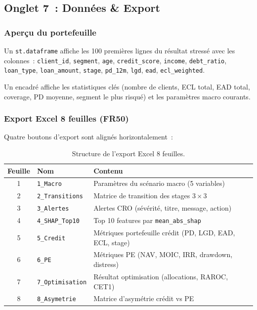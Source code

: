 \documentclass[12pt,a4paper]{article}
\begin{document}
\subsection{Onglet 7~: Donn\'ees \& Export}
\label{sec:tab7}

\subsubsection{Aper\c{c}u du portefeuille}

Un \texttt{st.dataframe} affiche les 100 premi\`eres lignes du r\'esultat stress\'e avec les colonnes~: \texttt{client\_id}, \texttt{segment}, \texttt{age}, \texttt{credit\_score}, \texttt{income}, \texttt{debt\_ratio}, \texttt{loan\_type}, \texttt{loan\_amount}, \texttt{stage}, \texttt{pd\_12m}, \texttt{lgd}, \texttt{ead}, \texttt{ecl\_weighted}.

Un encadr\'e affiche les statistiques cl\'es (nombre de clients, ECL total, EAD total, coverage, PD moyenne, segment le plus risqu\'e) et les param\`etres macro courants.

\subsubsection{Export Excel 8 feuilles (FR50)}

Quatre boutons d'export sont align\'es horizontalement~:

\begin{table}[ht]
\centering
\caption{Structure de l'export Excel 8 feuilles.}
\label{tab:excel}
\small
\begin{tabular}{@{}cll@{}}
\toprule
\textbf{Feuille} & \textbf{Nom} & \textbf{Contenu} \\
\midrule
1 & \texttt{1\_Macro} & Param\`etres du sc\'enario macro (5 variables) \\
2 & \texttt{2\_Transitions} & Matrice de transition des stages $3 \times 3$ \\
3 & \texttt{3\_Alertes} & Alertes CRO (s\'ev\'erit\'e, titre, message, action) \\
4 & \texttt{4\_SHAP\_Top10} & Top 10 features par \texttt{mean\_abs\_shap} \\
5 & \texttt{5\_Credit} & M\'etriques portefeuille cr\'edit (PD, LGD, EAD, ECL, stage) \\
6 & \texttt{6\_PE} & M\'etriques PE (NAV, MOIC, IRR, drawdown, distress) \\
7 & \texttt{7\_Optimisation} & R\'esultat optimisation (allocations, RAROC, CET1) \\
8 & \texttt{8\_Asymetrie} & Matrice d'asym\'etrie cr\'edit vs PE \\
\bottomrule
\end{tabular}
\end{table}
\end{document}
